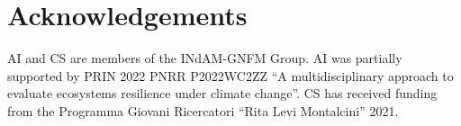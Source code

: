 \documentclass[a4paper,10pt,abstract=true,parskip=true]{scrartcl}
\theoremstyle{remark}
\numberwithin{equation}{section}
\numberwithin{thm}{section}
\begin{document}
%

\section*{Acknowledgements}
AI and CS are members of the INdAM-GNFM Group. AI was partially supported by PRIN 2022 PNRR P2022WC2ZZ ``A multidisciplinary approach to evaluate ecosystems resilience under climate change''. CS has received funding from the Programma Giovani Ricercatori ``Rita Levi Montalcini'' 2021.




\end{document}
